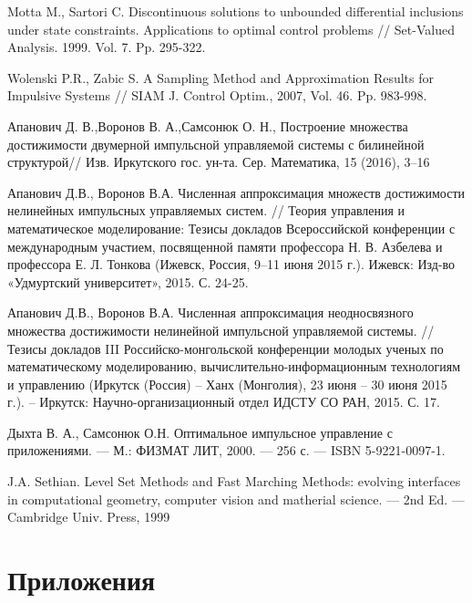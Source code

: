 \documentclass[a4paper,12pt]{article}
\begin{document}
\begin{thebibliography}{99}
     Motta M., Sartori C. Discontinuous solutions to
        unbounded differential inclusions under state constraints.
        Applications to optimal control problems // Set-Valued
        Analysis. 1999. Vol. 7. Pp. 295-322.

     Wolenski P.R., Zabic S.  A Sampling Method and
        Approximation Results for Impulsive Systems // SIAM J. Control
        Optim., 2007, Vol. 46. Pp. 983-998.

     {Апанович Д. В.,Воронов В. А.,Самсонюк О. Н.},
        Построение множества достижимости двумерной импульсной управляемой
        системы с билинейной структурой// Изв. Иркутского
        гос. ун-та. Сер. Математика, 15 (2016), 3–16

     Апанович Д.В., Воронов В.А. Численная аппроксимация
        множеств достижимости нелинейных импульсных управляемых систем. //
        Теория управления и математическое моделирование: Тезисы докладов
        Всероссийской конференции с международным участием, посвященной
        памяти профессора Н. В. Азбелева и профессора Е. Л. Тонкова (Ижевск,
        Россия, 9–11 июня 2015 г.). Ижевск: Изд-во «Удмуртский университет»,
        2015. С. 24-25.

     Апанович Д.В., Воронов В.А. Численная аппроксимация
        неодносвязного множества достижимости нелинейной импульсной
        управляемой системы. //  Тезисы докладов III Российско-монгольской
        конференции молодых ученых по математическому моделированию,
        вычислительно-информационным технологиям и управлению (Иркутск
        (Россия) – Ханх (Монголия), 23 июня – 30 июня 2015 г.). – Иркутск:
        Научно-организационный отдел ИДСТУ СО РАН, 2015. С. 17.


     {Дыхта В. А., Самсонюк О.Н.} Оптимальное импульсное
        управление с приложениями. — М.: ФИЗМАТ ЛИТ, 2000. — 256 с. — ISBN
        5-9221-0097-1.

     {J.A. Sethian.} Level Set Methods and Fast Marching Methods: evolving
        interfaces in computational geometry, computer vision and matherial
        science. — 2nd Ed. — Cambridge Univ. Press, 1999

\end{thebibliography}

\pagebreak
\section*{Приложения}
\label{sec:appl}
\end{document}
